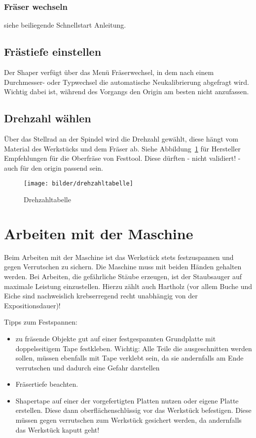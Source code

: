 \documentclass{\basedir/fablab-document}
\begin{document}
\subsubsection{Fräser wechseln}
siehe beiliegende Schnellstart Anleitung.

\subsection{Frästiefe einstellen}
Der Shaper verfügt über das Menü Fräserwechsel, in dem nach einem Durchmesser- oder Typwechsel die automatische Neukalibrierung abgefragt wird. Wichtig dabei ist, während des Vorgangs den Origin am besten nicht anzufassen.

\subsection{Drehzahl wählen}
Über das Stellrad an der Spindel wird die Drehzahl gewählt, diese hängt vom Material des Werkstücks und dem Fräser ab. Siehe Abbildung~\ref{fig:drehzahl}  für Hersteller Empfehlungen für die Oberfräse von Festtool. Diese dürften - nicht validiert! - auch für den origin passend sein.
\begin{figure}[h!]
    \centering
    \texttt{[image: bilder/drehzahltabelle]}
    \caption{Drehzahltabelle}
    \label{fig:drehzahl}
\end{figure}

\section{Arbeiten mit der Maschine}
Beim Arbeiten mit der Maschine ist das Werkstück stets festzuspannen und gegen Verrutschen zu sichern. Die Maschine muss mit beiden Händen gehalten werden. Bei Arbeiten, die gefährliche Stäube erzeugen, ist der Staubsauger auf maximale Leistung einzustellen. Hierzu zählt auch Hartholz (vor allem Buche und Eiche sind nachweislich krebserregend recht unabhängig von der Expositionsdauer)!

Tipps zum Festspannen:
\begin{itemize}
    \item zu fräsende Objekte gut auf einer festgespannten Grundplatte mit doppelseitigem Tape festkleben. Wichtig: Alle Teile die ausgeschnitten werden sollen, müssen ebenfalls mit Tape verklebt sein, da sie andernfalls am Ende verrutschen und dadurch eine Gefahr darstellen
    \item Fräsertiefe beachten.
    \item Shapertape auf einer der vorgefertigten Platten nutzen oder eigene Platte erstellen. Diese dann oberflächenschlüssig vor das Werkstück befestigen. Diese müssen gegen verrutschen zum Werkstück gesichert werden, da andernfalls das Werkstück kaputt geht!
\end{itemize}
\end{document}
